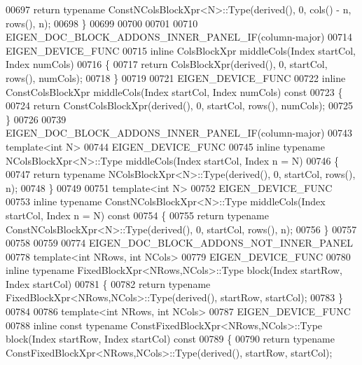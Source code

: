 \begin{DoxyCode}
00697   \textcolor{keywordflow}{return} \textcolor{keyword}{typename} ConstNColsBlockXpr<N>::Type(derived(), 0, cols() - n, rows(), n);
00698 \}
00699 
00700 
00701 
00710 EIGEN\_DOC\_BLOCK\_ADDONS\_INNER\_PANEL\_IF(column-major)
00714 EIGEN\_DEVICE\_FUNC
00715 \textcolor{keyword}{inline} ColsBlockXpr middleCols(Index startCol, Index numCols)
00716 \{
00717   \textcolor{keywordflow}{return} ColsBlockXpr(derived(), 0, startCol, rows(), numCols);
00718 \}
00719 
00721 EIGEN\_DEVICE\_FUNC
00722 \textcolor{keyword}{inline} ConstColsBlockXpr middleCols(Index startCol, Index numCols)\textcolor{keyword}{ const}
00723 \textcolor{keyword}{}\{
00724   \textcolor{keywordflow}{return} ConstColsBlockXpr(derived(), 0, startCol, rows(), numCols);
00725 \}
00726 
00739 EIGEN\_DOC\_BLOCK\_ADDONS\_INNER\_PANEL\_IF(column-major)
00743 \textcolor{keyword}{template}<\textcolor{keywordtype}{int} N>
00744 EIGEN\_DEVICE\_FUNC
00745 \textcolor{keyword}{inline} \textcolor{keyword}{typename} NColsBlockXpr<N>::Type middleCols(Index startCol, Index n = N)
00746 \{
00747   \textcolor{keywordflow}{return} \textcolor{keyword}{typename} NColsBlockXpr<N>::Type(derived(), 0, startCol, rows(), n);
00748 \}
00749 
00751 \textcolor{keyword}{template}<\textcolor{keywordtype}{int} N>
00752 EIGEN\_DEVICE\_FUNC
00753 \textcolor{keyword}{inline} \textcolor{keyword}{typename} ConstNColsBlockXpr<N>::Type middleCols(Index startCol, Index n = N)\textcolor{keyword}{ const}
00754 \textcolor{keyword}{}\{
00755   \textcolor{keywordflow}{return} \textcolor{keyword}{typename} ConstNColsBlockXpr<N>::Type(derived(), 0, startCol, rows(), n);
00756 \}
00757 
00758 
00759 
00774 EIGEN\_DOC\_BLOCK\_ADDONS\_NOT\_INNER\_PANEL
00778 \textcolor{keyword}{template}<\textcolor{keywordtype}{int} NRows, \textcolor{keywordtype}{int} NCols>
00779 EIGEN\_DEVICE\_FUNC
00780 \textcolor{keyword}{inline} \textcolor{keyword}{typename} FixedBlockXpr<NRows,NCols>::Type block(Index startRow, Index startCol)
00781 \{
00782   \textcolor{keywordflow}{return} \textcolor{keyword}{typename} FixedBlockXpr<NRows,NCols>::Type(derived(), startRow, startCol);
00783 \}
00784 
00786 \textcolor{keyword}{template}<\textcolor{keywordtype}{int} NRows, \textcolor{keywordtype}{int} NCols>
00787 EIGEN\_DEVICE\_FUNC
00788 \textcolor{keyword}{inline} \textcolor{keyword}{const} \textcolor{keyword}{typename} ConstFixedBlockXpr<NRows,NCols>::Type block(Index startRow, Index startCol)\textcolor{keyword}{ const}
00789 \textcolor{keyword}{}\{
00790   \textcolor{keywordflow}{return} \textcolor{keyword}{typename} ConstFixedBlockXpr<NRows,NCols>::Type(derived(), startRow, startCol);

\end{DoxyCode}
